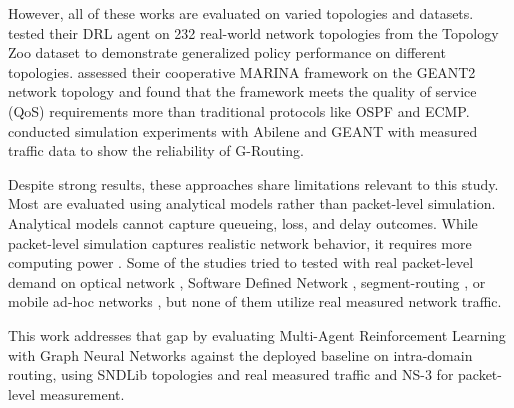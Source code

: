 However, all of these works are evaluated on varied topologies and datasets. \citet{ALMASAN2022184} tested their DRL agent on 232 real-world network topologies from the Topology Zoo dataset to demonstrate generalized policy performance on different topologies.  \citet{11364348} assessed their cooperative MARINA framework on the GEANT2 network topology and found that the framework meets the quality of service (QoS) requirements more than traditional protocols like OSPF and ECMP. \citet{10293208} conducted simulation experiments with Abilene and GEANT with measured traffic data to show the reliability of G-Routing.

Despite strong results, these approaches share limitations relevant to this study. Most are evaluated using analytical models rather than packet-level simulation. Analytical models cannot capture queueing, loss, and delay outcomes. While packet-level simulation captures realistic network behavior, it requires more computing power \citep{1443314}. Some of the studies tried to tested with real packet-level demand on optical network \citep{ALMASAN2022184}, Software Defined Network \citep{11364348}, segment-routing \citep{10225785}, or mobile ad-hoc networks \citep{11134361}, but none of them utilize real measured network traffic.

This work addresses that gap by evaluating Multi-Agent Reinforcement Learning with Graph Neural Networks against the deployed baseline on intra-domain routing, using SNDLib topologies and real measured traffic \citep{SNDlib10, OrlowskiPioroTomaszewskiWessaely2010} and NS-3 \citep{Riley2010} for packet-level measurement.